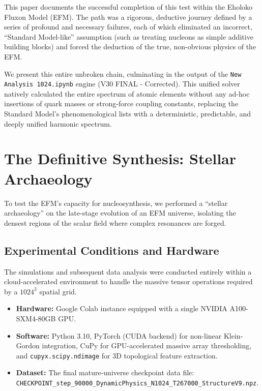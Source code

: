 \documentclass[11pt, twoside]{article}
\begin{document}
This paper documents the successful completion of this test within the Eholoko Fluxon Model (EFM). The path was a rigorous, deductive journey defined by a series of profound and necessary failures, each of which eliminated an incorrect, ``Standard Model-like'' assumption (such as treating nucleons as simple additive building blocks) and forced the deduction of the true, non-obvious physics of the EFM. 

We present this entire unbroken chain, culminating in the output of the \texttt{New Analysis 1024.ipynb} engine (V30 FINAL - Corrected). This unified solver natively calculated the entire spectrum of atomic elements without any ad-hoc insertions of quark masses or strong-force coupling constants, replacing the Standard Model's phenomenological lists with a deterministic, predictable, and deeply unified harmonic spectrum.

\section{The Definitive Synthesis: Stellar Archaeology}

To test the EFM's capacity for nucleosynthesis, we performed a ``stellar archaeology'' on the late-stage evolution of an EFM universe, isolating the densest regions of the scalar field where complex resonances are forged.

\subsection{Experimental Conditions and Hardware}
The simulations and subsequent data analysis were conducted entirely within a cloud-accelerated environment to handle the massive tensor operations required by a $1024^3$ spatial grid.
\begin{itemize}[leftmargin=*]
    \item \textbf{Hardware:} Google Colab instance equipped with a single NVIDIA A100-SXM4-80GB GPU.
    \item \textbf{Software:} Python 3.10, PyTorch (CUDA backend) for non-linear Klein-Gordon integration, CuPy for GPU-accelerated massive array thresholding, and \texttt{cupyx.scipy.ndimage} for 3D topological feature extraction.
    \item \textbf{Dataset:} The final mature-universe checkpoint data file: \\ \texttt{CHECKPOINT\_step\_90000\_DynamicPhysics\_N1024\_T267000\_StructureV9.npz}.
\end{itemize}
\end{document}
